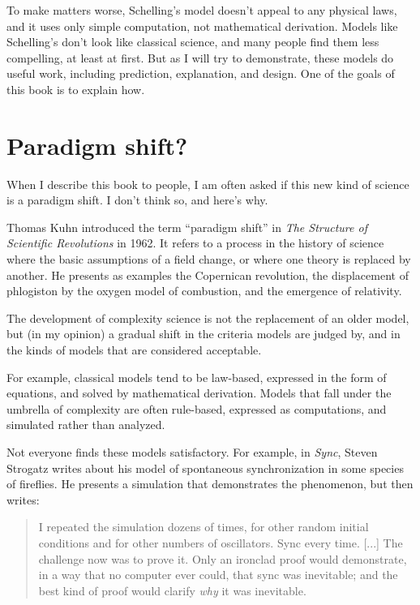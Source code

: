 \documentclass[10pt]{book}
\begin{document}
To make matters worse, Schelling's model doesn't appeal to any
physical laws, and it uses only simple computation, not mathematical
derivation.  Models like Schelling's don't look like classical
science, and many people find them less compelling, at least at first.
But as I will try to demonstrate, these models do useful work,
including prediction, explanation, and design.  One of the goals of
this book is to explain how.

\section{Paradigm shift?}

When I describe this book to people, I am often asked if this new kind
of science is a paradigm shift.  I don't think so, and here's why.

Thomas Kuhn introduced the term ``paradigm shift'' in {\em The
Structure of Scientific Revolutions} in 1962.  It refers to a process
in the history of science where the basic assumptions of a field
change, or where one theory is replaced by another.
He presents as examples the Copernican revolution, the displacement
of phlogiston by the oxygen model of combustion, and the emergence
of relativity.

The development of complexity science is not the replacement of
an older model, but (in my opinion) a gradual shift in the criteria
models are judged by, and in the kinds of models that are considered
acceptable.

For example, classical models tend to be law-based, expressed in the
form of equations, and solved by mathematical derivation.  Models that
fall under the umbrella of complexity are often rule-based,
expressed as computations, and simulated rather than analyzed.

Not everyone finds these models satisfactory.  For example, in
{\em Sync}, Steven Strogatz writes about his model of spontaneous
synchronization in some species of fireflies.  He presents a
simulation that demonstrates the phenomenon, but then writes:

\begin{quote}
I repeated the simulation dozens of times, for other random
initial conditions and for other numbers of oscillators.  Sync
every time. [...] The challenge now was to prove it.  Only an
ironclad proof would demonstrate, in a way that no computer ever
could, that sync was inevitable; and the best kind of proof would
clarify {\em why} it was inevitable.
\end{quote}
\end{document}
